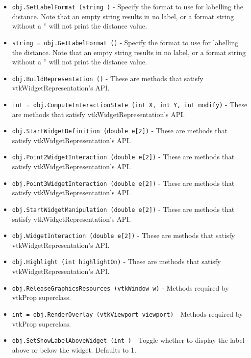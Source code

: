 \begin{itemize}
\item  \verb|obj.SetLabelFormat (string )| -  Specify the format to use for labelling the distance. Note that an empty
 string results in no label, or a format string without a ''%
 will not print the distance value.

\item  \verb|string = obj.GetLabelFormat ()| -  Specify the format to use for labelling the distance. Note that an empty
 string results in no label, or a format string without a ''%
 will not print the distance value.

\item  \verb|obj.BuildRepresentation ()| -  These are methods that satisfy vtkWidgetRepresentation's API.

\item  \verb|int = obj.ComputeInteractionState (int X, int Y, int modify)| -  These are methods that satisfy vtkWidgetRepresentation's API.

\item  \verb|obj.StartWidgetDefinition (double e[2])| -  These are methods that satisfy vtkWidgetRepresentation's API.

\item  \verb|obj.Point2WidgetInteraction (double e[2])| -  These are methods that satisfy vtkWidgetRepresentation's API.

\item  \verb|obj.Point3WidgetInteraction (double e[2])| -  These are methods that satisfy vtkWidgetRepresentation's API.

\item  \verb|obj.StartWidgetManipulation (double e[2])| -  These are methods that satisfy vtkWidgetRepresentation's API.

\item  \verb|obj.WidgetInteraction (double e[2])| -  These are methods that satisfy vtkWidgetRepresentation's API.

\item  \verb|obj.Highlight (int highlightOn)| -  These are methods that satisfy vtkWidgetRepresentation's API.

\item  \verb|obj.ReleaseGraphicsResources (vtkWindow w)| -  Methods required by vtkProp superclass.

\item  \verb|int = obj.RenderOverlay (vtkViewport viewport)| -  Methods required by vtkProp superclass.

\item  \verb|obj.SetShowLabelAboveWidget (int )| -  Toggle whether to display the label above or below the widget.
 Defaults to 1.


\end{itemize}
